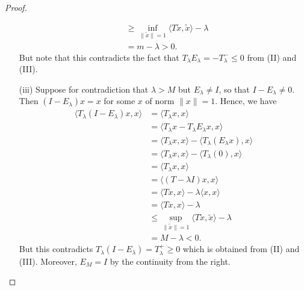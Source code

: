 \begin{proof}
\begin{enumerate}
\begin{align*}
                                                            &\geq \inf_{\|\tilde{x}\| = 1 } \langle T \tilde{x} ,  \tilde{x} \rangle - \lambda \\
                                                            &= m - \lambda > 0. 
    \end{align*}
    But note that this contradicts the fact that \( {T}_{\lambda} {E}_{\lambda} = - {T}_{\lambda}^{-} \leq 0  \) from (II) and (III).
    \item[(iii)] Suppose for contradiction that \( \lambda > M  \) but \( {E}_{\lambda} \neq I  \), so that \( I - {E}_{\lambda} \neq 0  \). Then \( (I - {E}_{\lambda})x = x  \) for some \( x  \) of norm \( \|x\| = 1  \). Hence, we have 
        \begin{align*}
            \langle {T}_{\lambda}(I - {E}_{\lambda}) x  ,  x  \rangle &= \langle {T}_{\lambda} x  ,  x  \rangle  \\
                                                                      &=  \langle {T}_{\lambda} x - {T}_{\lambda} {E}_{\lambda} x    ,  x  \rangle \\
                                                                      &= \langle {T}_{\lambda} x  ,  x  \rangle - \langle {T}_{\lambda} ({E}_{\lambda} x ) , x  \rangle \\
                                                                      &= \langle {T}_{\lambda}x  ,  x  \rangle - \langle {T}_{\lambda}(0)  ,  x  \rangle \\
                                                                      &= \langle {T}_{\lambda} x  ,  x  \rangle \\
                                                                      &= \langle (T - \lambda I ) x  ,  x  \rangle \\
                                                                      &= \langle T x  ,  x  \rangle - \lambda \langle x  ,  x  \rangle \\
                                                                      &= \langle T x  ,  x  \rangle - \lambda \tag{\( \|x\| = 1  \)} \\
                                                                      &\leq \sup_{\|\tilde{x}\| = 1 } \langle T \tilde{x}  ,  \tilde{x} \rangle - \lambda \\
                                                                      &= M - \lambda < 0. 
        \end{align*}
        But this contradicts \( {T}_{\lambda}(I - {E}_{\lambda} ) = {T}_{\lambda}^{+} \geq 0  \) which is obtained from (II) and (III). Moreover, \( {E}_{M} = I  \) by the continuity from the right.

\end{enumerate}
\end{proof}
